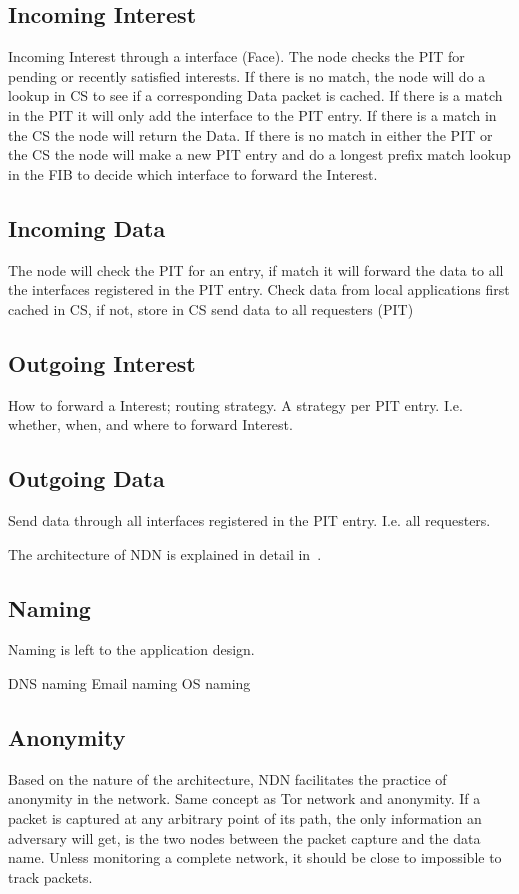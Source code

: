  
\subsection{Incoming Interest}
Incoming Interest through a interface (Face). The node checks the \gls{PIT} for pending or recently satisfied interests. 
If there is no match, the node will do a lookup in \gls{CS} to see if a corresponding Data packet is cached. 
If there is a match in the \gls{PIT} it will only add the interface to the \gls{PIT} entry. If there is a match in the \gls{CS} the node will return the Data. 
If there is no match in either the \gls{PIT} or the \gls{CS} the node will make a new \gls{PIT} entry and do a longest prefix match lookup in the \gls{FIB} to decide which interface to forward the Interest.

\subsection{Incoming Data}
The node will check  the \gls{PIT} for an entry, if match it will forward the data to all the interfaces registered in the \gls{PIT} entry.
Check data from local applications first cached in \gls{CS}, if not, store in \gls{CS} send data to all requesters (\gls{PIT})

\subsection{Outgoing Interest}
How to forward a Interest; routing strategy. A strategy per \gls{PIT} entry. I.e. whether, when, and where to forward Interest.

\subsection{Outgoing Data}
Send data through all interfaces registered in the \gls{PIT} entry. I.e. all requesters.

The architecture of \gls{NDN} is explained in detail in~\cite{NDN-0021}.

\subsection{Naming}\label{naming}
Naming is left to the application design.

\gls{DNS} naming
Email naming
\gls{OS} naming

\subsection{Anonymity}
Based on the nature of the architecture, \gls{NDN} facilitates the practice of anonymity in the network. 
Same concept as Tor network and anonymity.
If a packet is captured at any arbitrary point of its path, the only information an adversary will get, is the two nodes between the packet capture and the data name. Unless monitoring a complete network, it should be close to impossible to track packets.  


